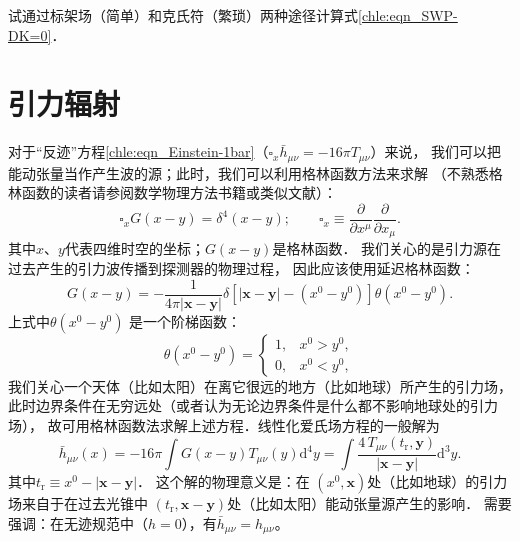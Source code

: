 \begin{exercise}
	试通过标架场（简单）和克氏符（繁琐）两种途径计算式\eqref{chle:eqn_SWP-DK=0}．
\end{exercise}



\section{引力辐射}

对于“反迹”方程\eqref{chle:eqn_Einstein-1bar}（$\square_{x} \bar{h}_{\mu\nu} = -16 \pi T_{\mu\nu}$）来说，
我们可以把能动张量当作产生波的源；此时，我们可以利用格林函数方法来求解
（不熟悉格林函数的读者请参阅数学物理方法书籍或类似文献）：
\begin{equation*}
	\square_x G\left(x-y\right)=\delta^4\left(x-y\right); \qquad
	\square_x \equiv \frac{\partial}{\partial x^\mu}\frac{\partial}{\partial x_\mu} .
\end{equation*}
其中$x$、$y$代表四维时空的坐标；$G\left(x-y\right)$是格林函数．
我们关心的是引力源在过去产生的引力波传播到探测器的物理过程，
因此应该使用{\kaishu 延迟格林函数}：
\begin{equation*}
	G(x-y)=-\frac{1}{4 \pi |\boldsymbol{x}-\boldsymbol{y}|} \delta\left[|\boldsymbol{x}-\boldsymbol{y}|
	-(x^0-y^0)\right] \theta(x^0-y^0).
\end{equation*}
上式中$\theta\left(x^0-y^0\right)$ 是一个阶梯函数：
\begin{equation*}
	\theta\left(x^0-y^0\right)= \begin{cases}1, & x^0>y^0, \\ 0, & x^0<y^0,\end{cases}
\end{equation*}
我们关心一个天体（比如太阳）在离它很远的地方（比如地球）所产生的引力场，
此时边界条件在无穷远处（或者认为无论边界条件是什么都不影响地球处的引力场），
故可用格林函数法求解上述方程．线性化爱氏场方程的一般解为
\begin{equation}\label{chle:eqn_LE-radiation}
	\bar{h}_{\mu \nu} (x)=-16 \pi \int G(x-y) T_{\mu \nu}(y) \mathrm{d}^4 y
	= \int \frac{4\, T_{\mu \nu}\left(t_{\mathrm{r}}, \boldsymbol{y}\right)}
	{|\boldsymbol{x}-\boldsymbol{y}|} \mathrm{d}^3 y.
\end{equation}
其中$t_{\mathrm{r}}\equiv x^0-|\boldsymbol{x}-\boldsymbol{y}|$．
这个解的物理意义是：在 $(x^0, \boldsymbol{x})$处（比如地球）的引力场来自于在过去光锥中
$\left(t_{\mathrm{r}}, \boldsymbol{x}-\boldsymbol{y}\right)$处（比如太阳）能动张量源产生的影响．
需要强调：在无迹规范中（$h=0$），有$\bar{h}_{\mu \nu}={h}_{\mu \nu}$。

